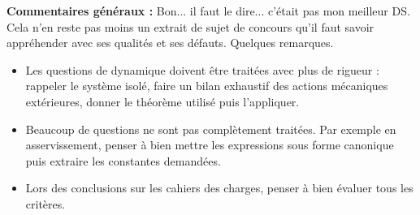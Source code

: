 \documentclass[10pt,fleqn]{article} %
\begin{document}

\pagestyle{fancy}
\thispagestyle{plain}


\def\columnseprulecolor{\color{ocre}}
\setlength{\columnseprule}{0.4pt} 



\vspace{6cm}
\textbf{Commentaires généraux : }
Bon... il faut le dire... c'était pas mon meilleur DS. Cela n'en reste pas moins un extrait de sujet de concours qu'il faut savoir appréhender avec ses qualités et ses défauts. Quelques remarques. 
\begin{itemize}
\item Les questions de dynamique doivent être traitées avec plus de rigueur : rappeler le système isolé, faire un bilan exhaustif des actions mécaniques extérieures, donner le théorème utilisé puis l'appliquer.
\item Beaucoup de questions ne sont pas complètement traitées. Par exemple en asservissement, penser à bien mettre les expressions sous forme canonique puis extraire les constantes demandées. 
\item Lors des conclusions sur les cahiers des charges, penser à bien évaluer tous les critères.
\end{itemize}








\end{document}
